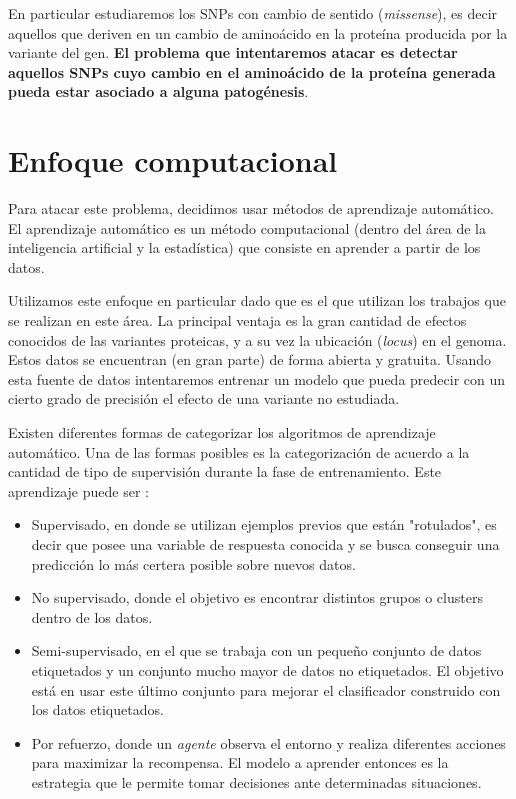 En particular estudiaremos los SNPs con cambio de sentido (\textit{missense}), es decir aquellos que deriven en un cambio de aminoácido en la proteína producida por la variante del gen. \textbf{El problema que intentaremos atacar es detectar aquellos SNPs cuyo cambio en el aminoácido de la proteína generada pueda estar asociado a alguna patogénesis}. 




\section{Enfoque computacional}

Para atacar este problema, decidimos usar métodos de aprendizaje automático. El aprendizaje automático es un método computacional (dentro del área de la inteligencia artificial y la estadística) que consiste en aprender a partir de los datos. 

Utilizamos este enfoque en particular dado que es el que utilizan los trabajos que se realizan en este área. La principal ventaja es la gran cantidad de efectos conocidos de las variantes proteicas, y a su vez la ubicación (\textit{locus}) en el genoma. Estos datos se encuentran (en gran parte) de forma abierta y gratuita. Usando esta fuente de datos intentaremos entrenar un modelo que pueda predecir con un cierto grado de precisión el efecto de una variante no estudiada. 

Existen diferentes formas de categorizar los algoritmos de aprendizaje automático. Una de las formas posibles es la categorización de acuerdo a la cantidad de tipo de supervisión durante la fase de entrenamiento. Este aprendizaje puede ser \cite{Barber2011}:

\begin{itemize}
\item Supervisado, en donde se utilizan ejemplos previos que están "rotulados", es decir que posee una variable de respuesta conocida y se busca conseguir una predicción lo más certera posible sobre nuevos datos. 
\item No supervisado, donde el objetivo es encontrar distintos grupos o clusters dentro de los datos.
\item Semi-supervisado, en el que se trabaja con un pequeño conjunto de datos etiquetados y un conjunto mucho mayor de datos no etiquetados. El objetivo está en usar este último conjunto para mejorar el clasificador construido con los datos etiquetados.
\item Por refuerzo, donde un \textit{agente} observa el entorno y realiza diferentes acciones para maximizar la recompensa. El modelo a aprender entonces es la estrategia que le permite tomar decisiones ante determinadas situaciones. 
\end{itemize}

